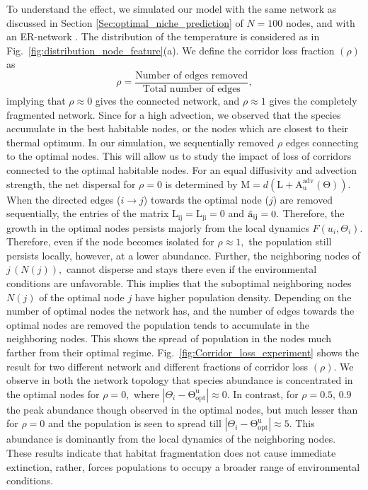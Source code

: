 \documentclass[12pt]{article}
\begin{document}
To understand the effect, we simulated our model with the same network as discussed in Section \ref{Sec:optimal_niche_prediction} of $N=100$ nodes, and with an ER-network \cite{erdos1961evolution}. The distribution of the temperature is considered as in Fig.~\ref{fig:distribution_node_feature}(a). We define the corridor loss fraction $(\rho)$ as
\begin{equation}
    \rho = \frac{\text{Number of edges removed}}{\text{Total number of edges}},
\end{equation}
implying that $\rho\approx0$ gives the connected network, and $\rho\approx 1$ gives the completely fragmented network. Since for a high advection, we observed that the species accumulate in the best habitable nodes, or the nodes which are closest to their thermal optimum. In our simulation, we sequentially removed $\rho$ edges connecting to the optimal nodes. This will allow us to study the impact of loss of corridors connected to the optimal habitable nodes. For an equal diffusivity and advection strength, the net dispersal for $\rho=0$ is determined by $\mathrm{M}=d (\mathrm{L}
+\mathrm{A_u^{adv}(\Theta)}).$ When the directed edges ($i\rightarrow j$) towards the optimal node ($j$) are removed sequentially, the entries of the matrix $\mathrm{L_{ij}}=\mathrm{L_{ji}}=0$ and $\mathrm{\Tilde{a}_{ij}}=0.$ Therefore, the growth in the optimal nodes persists majorly from the local dynamics $F(u_i,\Theta_i).$ Therefore, even if the node becomes isolated for $\rho \approx 1,$ the population still persists locally, however, at a lower abundance. Further, the neighboring nodes of $j\,(N(j)),$ cannot disperse and stays there even if the environmental conditions are unfavorable. This implies that the suboptimal neighboring nodes $N(j)$ of the optimal node $j$ have higher population density. Depending on the number of optimal nodes the network has, and the number of edges towards the optimal nodes are removed the population tends to accumulate in the neighboring nodes. This shows the spread of population in the nodes much farther from their optimal regime. Fig.~\ref{fig:Corridor_loss_experiment} shows the result for two different network and different fractions of corridor loss $(\rho).$ We observe in both the network topology that species abundance is concentrated in the optimal nodes for $\rho=0,$ where $|\Theta_i-\mathrm{\Theta^u_{opt}}|\approx 0.$ In contrast, for $\rho=0.5,\,0.9$ the peak abundance though observed in the optimal nodes, but much lesser than for $\rho=0$ and the population is seen to spread till $|\Theta_i-\mathrm{\Theta^u_{opt}}|\approx 5.$ This abundance is dominantly from the local dynamics of the neighboring nodes. These results indicate that habitat fragmentation does not cause immediate extinction, rather, forces populations to occupy a broader range of environmental conditions.
\end{document}
